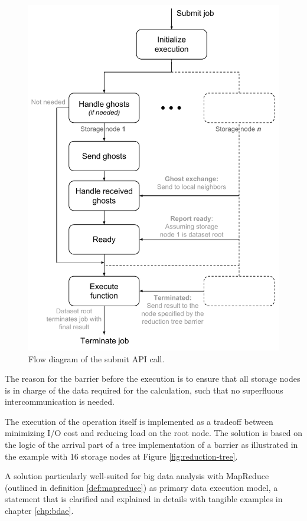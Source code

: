 \begin{figure}
	\centering
	\includegraphics[scale=0.7]{pdf/submit-job.pdf}
	\caption{Flow diagram of the submit API call. \label{fig:submit-job}}
\end{figure}	

\noindent
The reason for the barrier before the execution is to ensure that all storage nodes is in charge of the data required for the calculation, such that no superfluous intercommunication is needed.
\newline

The execution of the operation itself is implemented as a tradeoff between minimizing I/O cost and reducing load on the root node. The solution is based on the logic of the arrival part of a tree implementation of a barrier as illustrated in the example with 16 storage nodes at Figure \ref{fig:reduction-tree}. 

A solution particularly well-suited for big data analysis with MapReduce (outlined in definition \ref{def:mapreduce}) as primary data execution model, a statement that is clarified and explained in details with tangible examples in chapter \ref{chp:bdae}.
\newline

